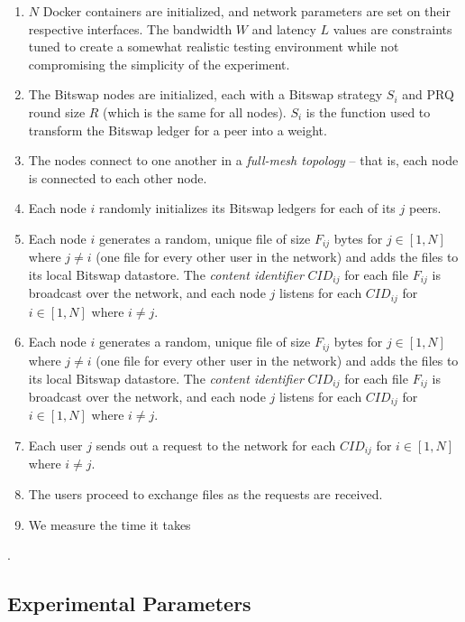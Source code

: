 \begin{enumerate}
\item
    $N$ Docker containers are initialized, and network parameters are set on
    their respective interfaces. The bandwidth $W$ and latency $L$ values
    are constraints tuned to create a somewhat realistic testing environment
    while not compromising the simplicity of the experiment.
\item
    The Bitswap nodes are initialized, each with a Bitswap strategy $S_i$ and
    PRQ round size $R$ (which is the same for all nodes). $S_i$ is the function used
    to transform the Bitswap ledger for a peer into a weight.
\item
    The nodes connect to one another in a \textit{full-mesh topology} -- that is, each node
    is connected to each other node.
\item
    Each node $i$ randomly initializes its Bitswap ledgers for each of its $j$ peers.
\item
    Each node $i$ generates a random, unique file of size $F_{ij}$ bytes for $j \in [1, N]$
    where $j \neq i$ (one file for every other user in the network) and adds the
    files to its local Bitswap datastore. The \textit{content identifier} $CID_{ij}$ for
    each file $F_{ij}$ is broadcast over the network, and each node $j$ listens for
    each $CID_{ij}$ for $i \in [1, N]$ where $i \neq j$.
\item
    Each node $i$ generates a random, unique file of size $F_{ij}$ bytes for $j \in [1, N]$
    where $j \neq i$ (one file for every other user in the network) and adds the
    files to its local Bitswap datastore. The \textit{content identifier} $CID_{ij}$ for
    each file $F_{ij}$ is broadcast over the network, and each node $j$ listens for
    each $CID_{ij}$ for $i \in [1, N]$ where $i \neq j$.
\item
    Each user $j$ sends out a request to the network for each $CID_{ij}$ for
    $i \in [1, N]$ where $i \neq j$.
\item
    The users proceed to exchange files as the requests are received.
\item
    We measure the time it takes 
\end{enumerate}.

\hypertarget{experimental-parameters}{%
\subsection{Experimental Parameters}\label{experimental-parameters}}

